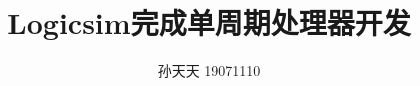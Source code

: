 \documentclass[scheme = chinese]{ctexart}
\begin{document}
\title{Logicsim完成单周期处理器开发}
\author{孙天天 19071110}


\tableofcontents
\clearpage

\maketitle


\clearpage

\clearpage

\clearpage

\clearpage
\end{document}
